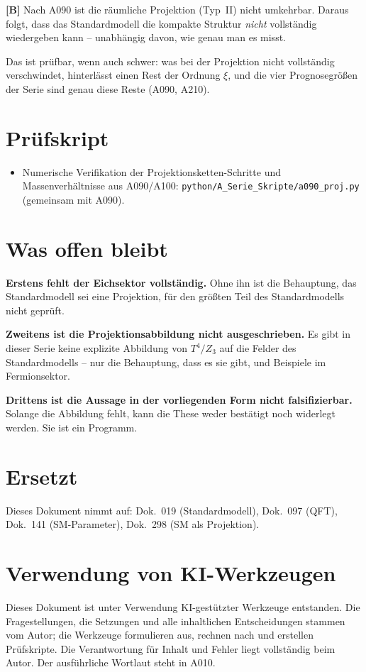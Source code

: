 \textbf{[B]} Nach A090 ist die räumliche Projektion (Typ~II) nicht umkehrbar.
Daraus folgt, dass das Standardmodell die kompakte Struktur \emph{nicht}
vollständig wiedergeben kann -- unabhängig davon, wie genau man es misst.

Das ist prüfbar, wenn auch schwer: was bei der Projektion nicht vollständig
verschwindet, hinterlässt einen Rest der Ordnung $\xi$, und die vier
Prognosegrößen der Serie sind genau diese Reste (A090, A210).


\section{Prüfskript}

\begin{itemize}[leftmargin=2em,itemsep=2pt,topsep=2pt]
  \item Numerische Verifikation der Projektionsketten-Schritte und
    Massenverhältnisse aus A090/A100:
    \texttt{python/A\_Serie\_Skripte/a090\_proj.py} (gemeinsam mit A090).
\end{itemize}

\section{Was offen bleibt}

\textbf{Erstens fehlt der Eichsektor vollständig.} Ohne ihn ist die Behauptung,
das Standardmodell sei eine Projektion, für den größten Teil des
Standardmodells nicht geprüft.

\textbf{Zweitens ist die Projektionsabbildung nicht ausgeschrieben.} Es gibt in
dieser Serie keine explizite Abbildung von $T^4/Z_3$ auf die Felder des
Standardmodells -- nur die Behauptung, dass es sie gibt, und Beispiele im
Fermionsektor.

\textbf{Drittens ist die Aussage in der vorliegenden Form nicht falsifizierbar.}
Solange die Abbildung fehlt, kann die These weder bestätigt noch widerlegt
werden. Sie ist ein Programm.

\section{Ersetzt}

Dieses Dokument nimmt auf: Dok.~019 (Standardmodell), Dok.~097 (QFT), Dok.~141
(SM-Parameter), Dok.~298 (SM als Projektion).

\section{Verwendung von KI-Werkzeugen}

Dieses Dokument ist unter Verwendung KI-gestützter Werkzeuge entstanden. Die
Fragestellungen, die Setzungen und alle inhaltlichen Entscheidungen stammen vom
Autor; die Werkzeuge formulieren aus, rechnen nach und erstellen Prüfskripte.
Die Verantwortung für Inhalt und Fehler liegt vollständig beim Autor. Der
ausführliche Wortlaut steht in A010.
